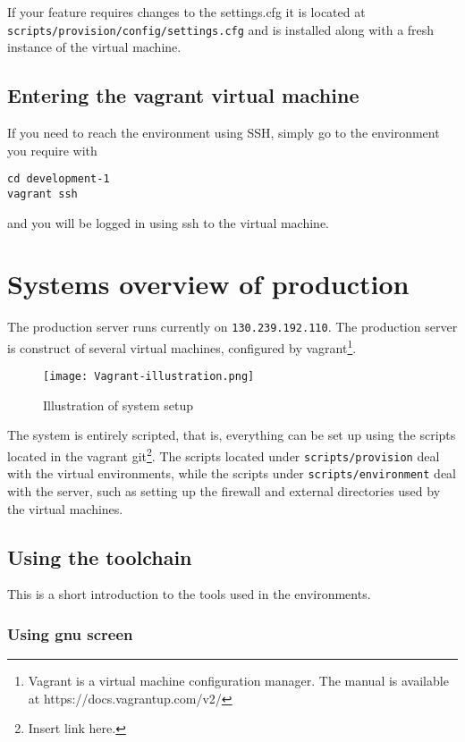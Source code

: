 If your feature requires changes to the settings.cfg it is located at
\texttt{scripts/provision/config/settings.cfg} and is installed along
with a fresh instance of the virtual machine.

\subsection{Entering the vagrant virtual
machine}\label{entering-the-vagrant-virtual-machine}

If you need to reach the environment using SSH, simply go to the
environment you require with

\begin{verbatim}
cd development-1
vagrant ssh
\end{verbatim}

and you will be logged in using ssh to the virtual machine.

\section{Systems overview of
production}\label{systems-overview-of-production}

The production server runs currently on \texttt{130.239.192.110}. The
production server is construct of several virtual machines, configured
by vagrant\footnote{Vagrant is a virtual machine configuration manager.
  The manual is available at https://docs.vagrantup.com/v2/}.

\begin{figure}[htbp]
\centering
\texttt{[image: Vagrant-illustration.png]}
\caption{Illustration of system setup}
\end{figure}

The system is entirely scripted, that is, everything can be set up using
the scripts located in the vagrant git\footnote{Insert link here.}. The
scripts located under \texttt{scripts/provision} deal with the virtual
environments, while the scripts under \texttt{scripts/environment} deal
with the server, such as setting up the firewall and external
directories used by the virtual machines.

\subsection{Using the toolchain}\label{using-the-toolchain}

This is a short introduction to the tools used in the environments.

\subsubsection{Using gnu screen}\label{using-gnu-screen}


